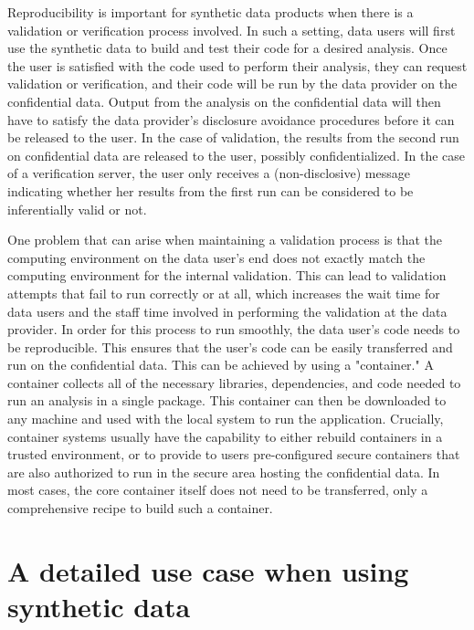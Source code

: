 \documentclass[]{hdsr}
\begin{document}
Reproducibility is important for synthetic data products when there
is a validation or verification process involved. In such a setting, data users will first use the synthetic
data to build and test their code for a desired analysis. Once the user is satisfied with the code used to
perform their analysis, they can request validation or verification, and their code will be run by the data provider on the confidential data. Output from the analysis on the confidential data will then have to satisfy the data provider's disclosure avoidance procedures before it can be released to the user. In the case of validation, the results from the second run on confidential data are released to the user, possibly confidentialized. In the case of a verification server, the user only receives a (non-disclosive) message indicating whether her results from the first run can be considered to be inferentially valid or not.

One problem that can arise when maintaining a validation process is that the 
computing environment on the data user’s end does not exactly match the computing environment for
the internal validation. This can lead to validation attempts that fail to run correctly or at all, which
increases the wait time for data users and the staff time involved in performing the validation at the data provider. 
In order for this process to run smoothly, the data user's code needs to be reproducible.  This ensures that the user’s code can be easily transferred and
run on the confidential data. This can be achieved by using a "container." A container collects all of the
necessary libraries, dependencies, and code needed to run an analysis in a single
package. This container can then be downloaded to any machine and used with the local system to run
the application. Crucially, container systems usually have the capability to either rebuild containers in a trusted environment, or to provide to users pre-configured secure containers that are also authorized to run in the secure area hosting the confidential data. In most cases, the core container itself does not need to be transferred, only a comprehensive recipe to build such a container.

\section{A detailed use case when using synthetic data}
\label{sec:usecase}
\end{document}
